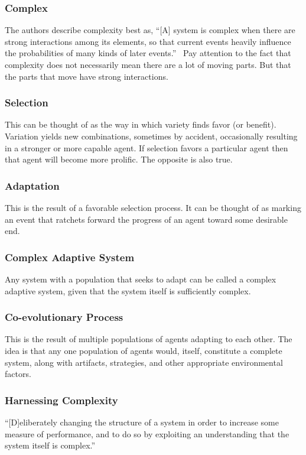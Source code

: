 \documentclass[jou,apacite]{apa6}
\begin{document}
\subsubsection{Complex}
The authors describe complexity best as, ``[A] system is complex when there are strong interactions among its elements, so that current events heavily influence the probabilities of many kinds of later events.''~\cite[page 7]{Axelrod}  Pay attention to the fact that complexity does not necessarily mean there are a lot of moving parts.  But that the parts that move have strong interactions.

\subsubsection{Selection}
This can be thought of as the way in which variety finds favor (or benefit).  Variation yields new combinations, sometimes by accident, occasionally resulting in a stronger or more capable agent.  If selection favors a particular agent then that agent will become more prolific.  The opposite is also true.

\subsubsection{Adaptation}
This is the result of a favorable selection process.  It can be thought of as marking an event that ratchets forward the progress of an agent toward some desirable end.

\subsubsection{Complex Adaptive System}
Any system with a population that seeks to adapt can be called a complex adaptive system, given that the system itself is sufficiently complex.

\subsubsection{Co-evolutionary Process}
This is the result of multiple populations of agents adapting to each other.  The idea is that any one population of agents would, itself, constitute a complete system, along with artifacts, strategies, and other appropriate environmental factors.

\subsubsection{Harnessing Complexity}
``[D]eliberately changing the structure of a system in order to increase some measure of performance, and to do so by exploiting an understanding that the system itself is complex.''~\cite[page 9]{Axelrod}
\end{document}
